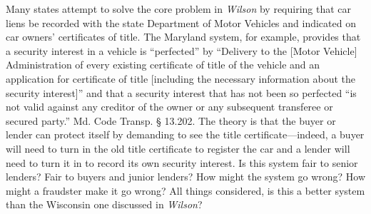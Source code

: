 \item Many states attempt to solve the core problem in \textit{Wilson} by
requiring that car liens be recorded with the state Department of Motor
Vehicles and indicated on car owners' certificates of title. The Maryland
system, for example, provides that a security interest in a vehicle is
``perfected'' by ``Delivery to the [Motor Vehicle] Administration of every
existing certificate of title of the vehicle and an application for certificate
of title [including the necessary information about the security interest]''
and that a security interest that has not been so perfected ``is not valid
against any creditor of the owner or any subsequent transferee or secured
party.'' Md. Code Transp. {\S} 13.202. The theory is that the buyer or lender
can protect itself by demanding to see the title certificate---indeed, a buyer
will need to turn in the old title certificate to register the car and a lender
will need to turn it in to record its own security interest. Is this system
fair to senior lenders? Fair to buyers and junior lenders? How might the system
go wrong? How might a fraudster make it go wrong? All things considered, is
this a better system than the Wisconsin one discussed in \textit{Wilson}?

